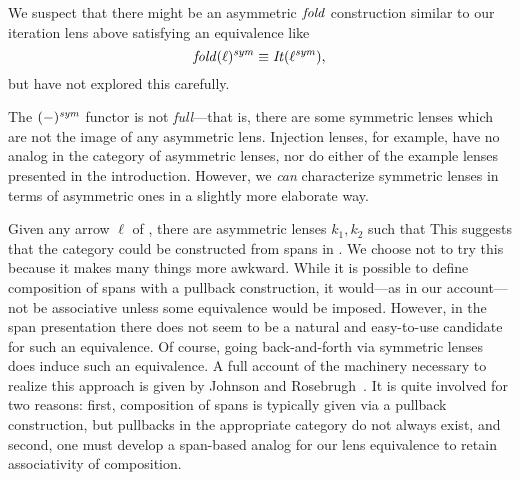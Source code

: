 \begin{defn}[$R$-similarity]
\begin{theorem}
\begin{lemma}
\begin{theorem}[No products]
\begin{lemma}
\begin{defn}
\begin{theorem}
\begin{theorem}
\begin{corollary}[Hylomorphism]
\begin{defn}
\begin{defn}
\begin{defn}[Symmetrization]
We suspect that there might be an asymmetric $\mathit{fold}$ construction
similar to our iteration lens above satisfying an equivalence like
\[\mathit{fold}(\ell)^\mathit{sym} \equiv \mathit{It}(\ell^\mathit{sym}),\]
but have not explored this carefully.

The $(-)^\mathit{sym}$ functor is not {\em full}---that is,
there are some symmetric lenses which are not the image of any asymmetric
lens. Injection lenses, for example, have no analog in the category of
asymmetric lenses, nor do either of the example lenses presented in the
introduction. However, we \emph{can} characterize symmetric lenses in
terms of asymmetric ones in a slightly more elaborate way.

\iffull
\begin{theorem}\label{asymmetrization_of_lenses}
\else
\begin{theorem}\label{asymmetrization_of_lenses}
\fi
  Given any arrow $\ell$ of \LENS{}, there are asymmetric lenses
  $k_1,k_2$ such that  \iffull This suggests that the category \LENS{} could be
  constructed from spans in \ALENS.
  \ifcomplement
  We choose not to try this because
  it makes many things more awkward. While it is possible to define
  composition of spans with a pullback construction, it would---as in
  our account---not be associative unless some equivalence would be
  imposed. However, in the span presentation there does not seem to be
  a natural and easy-to-use candidate for such an equivalence. Of
  course, going back-and-forth via symmetric lenses does induce such
  an equivalence.
  \else
  A full account of the machinery necessary to realize this approach is
  given by Johnson and Rosebrugh~\cite{johnson2014spans}. It is quite
  involved for two reasons: first, composition of spans is typically given
  via a pullback construction, but pullbacks in the appropriate category do
  not always exist, and second, one must develop a span-based analog for our
  lens equivalence to retain associativity of composition.
  \fi%
  \fi%
\end{theorem}


\end{theorem}
\end{defn}
\end{defn}
\end{defn}
\end{corollary}
\end{theorem}
\end{theorem}
\end{defn}
\end{lemma}
\end{theorem}
\end{lemma}
\end{theorem}
\end{defn}
